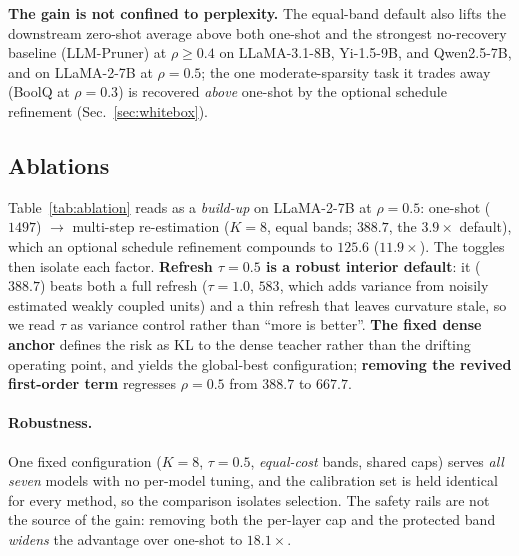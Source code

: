 \textbf{The gain is not confined to perplexity.} The equal-band default also lifts the downstream zero-shot average above both one-shot and the strongest no-recovery baseline (LLM-Pruner) at $\rho{\ge}0.4$ on LLaMA-3.1-8B, Yi-1.5-9B, and Qwen2.5-7B, and on LLaMA-2-7B at $\rho{=}0.5$; the one moderate-sparsity task it trades away (BoolQ at $\rho{=}0.3$) is recovered \emph{above} one-shot by the optional schedule refinement (Sec.~\ref{sec:whitebox}).

\subsection{Ablations}
\label{sec:ablations}
Table~\ref{tab:ablation} reads as a \emph{build-up} on LLaMA-2-7B at $\rho{=}0.5$: one-shot ($1497$) $\to$ multi-step re-estimation ($K{=}8$, equal bands; $388.7$, the $3.9\times$ default), which an optional schedule refinement compounds to $125.6$ ($11.9\times$).
The toggles then isolate each factor.
\textbf{Refresh $\tau{=}0.5$ is a robust interior default}: it ($388.7$) beats both a full refresh ($\tau{=}1.0$, $583$, which adds variance from noisily estimated weakly coupled units) and a thin refresh that leaves curvature stale, so we read $\tau$ as variance control rather than ``more is better''.
\textbf{The fixed dense anchor} defines the risk as KL to the dense teacher rather than the drifting operating point, and yields the global-best configuration; \textbf{removing the revived first-order term} regresses $\rho{=}0.5$ from $388.7$ to $667.7$.

\paragraph{Robustness.} One fixed configuration ($K{=}8$, $\tau{=}0.5$, \emph{equal-cost} bands, shared caps) serves \emph{all seven} models with no per-model tuning, and the calibration set is held identical for every method, so the comparison isolates selection.
The safety rails are not the source of the gain: removing both the per-layer cap and the protected band \emph{widens} the advantage over one-shot to $18.1\times$.

